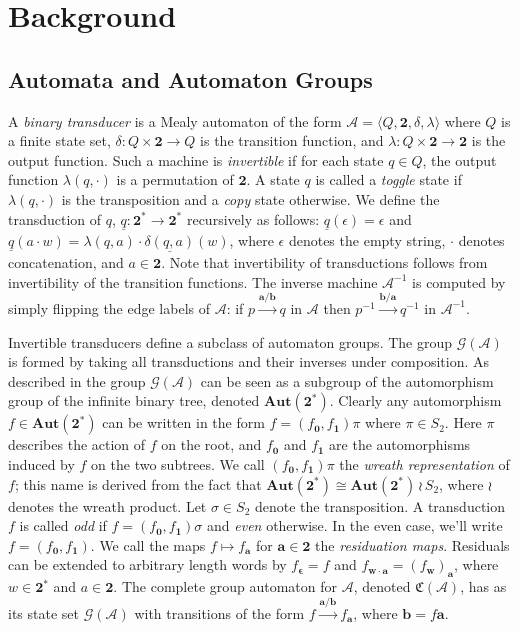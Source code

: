 \documentclass[12pt, letterpaper]{article}
\newcommand{\bin}{\mathbf 2}
\newcommand{\A}{\mathcal A}
\newcommand{\ch}[1]{\mathbf{#1}}
\newcommand{\res}[2]{{{#1}_{\ch{#2}}}}
\newcommand{\comp}{\mathfrak C}
\newcommand{\Aut}{\mathbf{Aut}}
\newcommand{\gp}{\mathcal G}
\begin{document}
\pagebreak
\section{Background}
\subsection{Automata and Automaton Groups}
A \emph{binary transducer} is a Mealy automaton of the form $\A = \langle Q,
\bin, \delta, \lambda \rangle$ where $Q$ is a finite state set, $\delta: Q
\times \bin \rightarrow Q$ is the transition function, and $\lambda: Q \times
\bin \rightarrow \bin$ is the output function. Such a machine is
\emph{invertible} if for each state $q \in Q$, the output function $\lambda(q,
\cdot)$ is a permutation of $\bin$. A state $q$ is called a \emph{toggle} state
if $\lambda(q, \cdot)$ is the transposition and a \emph{copy} state otherwise.
We define the transduction of $q$, $\underline{q}: \bin^* \rightarrow \bin^*$
recursively as follows: $\underline{q}(\epsilon) = \epsilon$ and
$\underline{q}(a \cdot w) = \lambda(q, a) \cdot \underline{\delta(q, a)}(w)$,
where $\epsilon$ denotes the empty string, $\cdot$ denotes concatenation, and
$a \in \bin$. Note that invertibility of transductions follows from
invertibility of the transition functions.  The inverse machine $\A^{-1}$ is
computed by simply flipping the edge labels of $\A$: if
$p \xrightarrow{\ch{a} / \ch{b}} q$ in $\A$ then
$p^{-1} \xrightarrow{\ch{b} / \ch{a}} q^{-1}$ in $\A^{-1}$.

Invertible transducers define a subclass of automaton groups. The group
$\gp(\A)$ is formed by taking all transductions and their inverses under
composition.  As described in \cite{jalc170214} the group $\gp(\A)$ can be seen
as a subgroup of the automorphism group of the infinite binary tree, denoted
$\Aut(\bin^*)$.  Clearly any automorphism $f \in \Aut(\bin^*)$ can be written
in the form $f = (\res{f}{0}, \res{f}{1})\pi$ where $\pi \in S_2$. Here $\pi$
describes the action of $f$ on the root, and $\res{f}{0}$ and $\res{f}{1}$ are
the automorphisms induced by $f$ on the two subtrees. We call $(\res{f}{0},
\res{f}{1})\pi$ the \emph{wreath representation} of $f$; this name is derived
from the fact that $\Aut(\bin^*) \cong \Aut(\bin^*) \, \wr \, S_2$, where $\wr$
denotes the wreath product. Let $\sigma \in S_2$ denote the transposition. A
transduction $f$ is called \emph{odd} if $f = (\res{f}{0}, \res{f}{1}) \sigma$
and \emph{even} otherwise. In the even case, we'll write $f = (\res{f}{0},
\res{f}{1})$. We call the maps $f \mapsto \res{f}{a}$ for $\ch{a} \in \bin$ the
\emph{residuation maps}. Residuals can be extended to arbitrary length words by
$\res{f}{\epsilon} = f$ and $\res{f}{w \cdot a} = \res{(\res{f}{w})}{a}$, where
$w \in \bin^*$ and $a \in \bin$. The complete group automaton for $\A$, denoted
$\comp(\A)$, has as its state set $\gp(\A)$ with transitions of the form $f
\xrightarrow{\ch{a} / \ch{b}} \res{f}{a}$, where $\ch{b} = f \ch{a}$.
\end{document}
